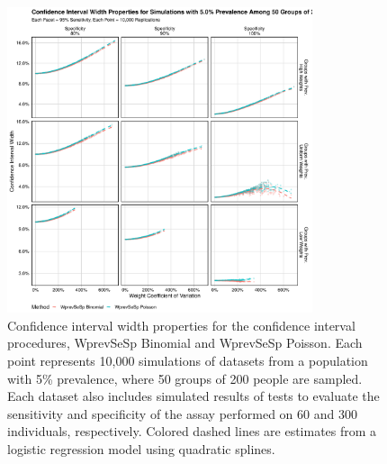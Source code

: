 \begin{figure}
\centering
\includegraphics[width=0.8\textwidth]{imperfect_confidence_interval_width_50_groups_0_05_prev}
\caption{Confidence interval width properties for the confidence interval procedures, WprevSeSp Binomial and WprevSeSp Poisson.
Each point represents 10,000 simulations of datasets from a population with 5\% prevalence, where 50 groups of 200 people are sampled.
Each dataset also includes simulated results of tests to evaluate the sensitivity and specificity of the assay performed on 60 and 300 individuals, respectively.
Colored dashed lines are estimates from a logistic regression model using quadratic splines.}
\label{ch_3:fig:imperfect_confidence_interval_width_50_groups_0_05_prev}
\end{figure}


